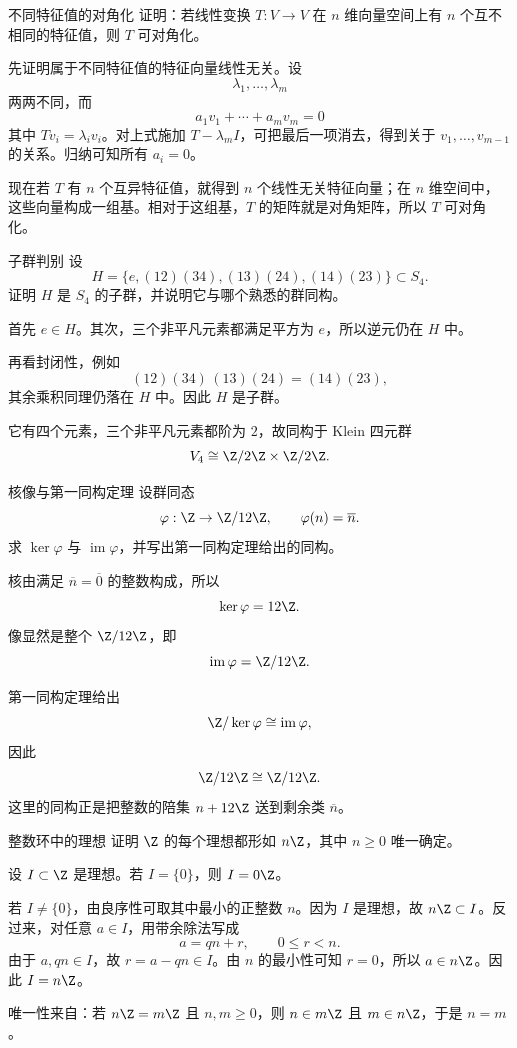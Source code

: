 \begin{problem}{不同特征值的对角化}
\easy
证明：若线性变换 $T:V\to V$ 在 $n$ 维向量空间上有 $n$ 个互不相同的特征值，则 $T$ 可对角化。
\end{problem}
\begin{solution}
先证明属于不同特征值的特征向量线性无关。设
\[
\lambda_1,\dots,\lambda_m
\]
两两不同，而
\[
a_1v_1+\cdots+a_mv_m=0
\]
其中 $Tv_i=\lambda_iv_i$。对上式施加 $T-\lambda_mI$，可把最后一项消去，得到关于 $v_1,\dots,v_{m-1}$ 的关系。归纳可知所有 $a_i=0$。

现在若 $T$ 有 $n$ 个互异特征值，就得到 $n$ 个线性无关特征向量；在 $n$ 维空间中，这些向量构成一组基。相对于这组基，$T$ 的矩阵就是对角矩阵，所以 $T$ 可对角化。
\end{solution}

\begin{problem}{子群判别}
\easy
设
\[
H=\{e,(12)(34),(13)(24),(14)(23)\}\subset S_4.
\]
证明 $H$ 是 $S_4$ 的子群，并说明它与哪个熟悉的群同构。
\end{problem}
\begin{solution}
首先 $e\in H$。其次，三个非平凡元素都满足平方为 $e$，所以逆元仍在 $H$ 中。

再看封闭性，例如
\[
(12)(34)\,(13)(24)=(14)(23),
\]
其余乘积同理仍落在 $H$ 中。因此 $H$ 是子群。

它有四个元素，三个非平凡元素都阶为 $2$，故同构于 Klein 四元群
\[
V_4\cong \Z/2\Z\times\Z/2\Z.
\]
\end{solution}

\begin{problem}{核像与第一同构定理}
\easy
设群同态
\[
\varphi:\Z\to\Z/12\Z,
\qquad
\varphi(n)=\overline n.
\]
求 $\ker\varphi$ 与 $\operatorname{im}\varphi$，并写出第一同构定理给出的同构。
\end{problem}
\begin{solution}
核由满足 $\overline n=\overline0$ 的整数构成，所以
\[
\ker\varphi=12\Z.
\]
像显然是整个 $\Z/12\Z$，即
\[
\operatorname{im}\varphi=\Z/12\Z.
\]

第一同构定理给出
\[
\Z/\ker\varphi\cong\operatorname{im}\varphi,
\]
因此
\[
\Z/12\Z\cong\Z/12\Z.
\]
这里的同构正是把整数的陪集 $n+12\Z$ 送到剩余类 $\overline n$。
\end{solution}

\begin{problem}{整数环中的理想}
\easy
证明 $\Z$ 的每个理想都形如 $n\Z$，其中 $n\ge0$ 唯一确定。
\end{problem}
\begin{solution}
设 $I\subset\Z$ 是理想。若 $I=\{0\}$，则 $I=0\Z$。

若 $I\neq\{0\}$，由良序性可取其中最小的正整数 $n$。因为 $I$ 是理想，故 $n\Z\subset I$。反过来，对任意 $a\in I$，用带余除法写成
\[
a=qn+r,
\qquad 0\le r<n.
\]
由于 $a,qn\in I$，故 $r=a-qn\in I$。由 $n$ 的最小性可知 $r=0$，所以 $a\in n\Z$。因此 $I=n\Z$。

唯一性来自：若 $n\Z=m\Z$ 且 $n,m\ge0$，则 $n\in m\Z$ 且 $m\in n\Z$，于是 $n=m$。
\end{solution}

